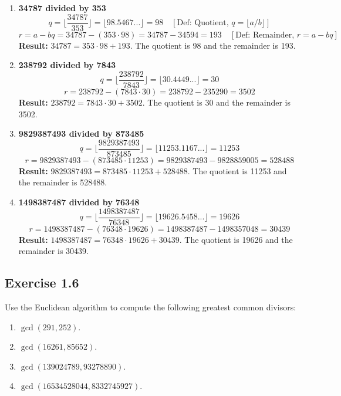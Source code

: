 \begin{enumerate}
    \item \textbf{34787 divided by 353}
    $$
    q = \lfloor \frac{34787}{353} \rfloor = \lfloor 98.5467... \rfloor = 98 \quad [\text{Def: Quotient, } q = \lfloor a/b \rfloor]
    $$
    $$
    r = a - bq = 34787 - (353 \cdot 98) = 34787 - 34594 = 193 \quad [\text{Def: Remainder, } r = a - bq]
    $$
    \textbf{Result:} $34787 = 353 \cdot 98 + 193$. The quotient is 98 and the remainder is 193.

    \item \textbf{238792 divided by 7843}
    $$
    q = \lfloor \frac{238792}{7843} \rfloor = \lfloor 30.4449... \rfloor = 30
    $$
    $$
    r = 238792 - (7843 \cdot 30) = 238792 - 235290 = 3502
    $$
    \textbf{Result:} $238792 = 7843 \cdot 30 + 3502$. The quotient is 30 and the remainder is 3502.

    \item \textbf{9829387493 divided by 873485}
    $$
    q = \lfloor \frac{9829387493}{873485} \rfloor = \lfloor 11253.1167... \rfloor = 11253
    $$
    $$
    r = 9829387493 - (873485 \cdot 11253) = 9829387493 - 9828859005 = 528488
    $$
    \textbf{Result:} $9829387493 = 873485 \cdot 11253 + 528488$. The quotient is 11253 and the remainder is 528488.

    \item \textbf{1498387487 divided by 76348}
    $$
    q = \lfloor \frac{1498387487}{76348} \rfloor = \lfloor 19626.5458... \rfloor = 19626
    $$
    $$
    r = 1498387487 - (76348 \cdot 19626) = 1498387487 - 1498357048 = 30439
    $$
    \textbf{Result:} $1498387487 = 76348 \cdot 19626 + 30439$. The quotient is 19626 and the remainder is 30439.
\end{enumerate}

\newpage
\subsection*{Exercise 1.6}
Use the Euclidean algorithm to compute the following greatest common divisors:
\begin{enumerate}
    \item $\gcd(291, 252)$.
    \item $\gcd(16261, 85652)$.
    \item $\gcd(139024789, 93278890)$.
    \item $\gcd(16534528044, 8332745927)$.
\end{enumerate}

